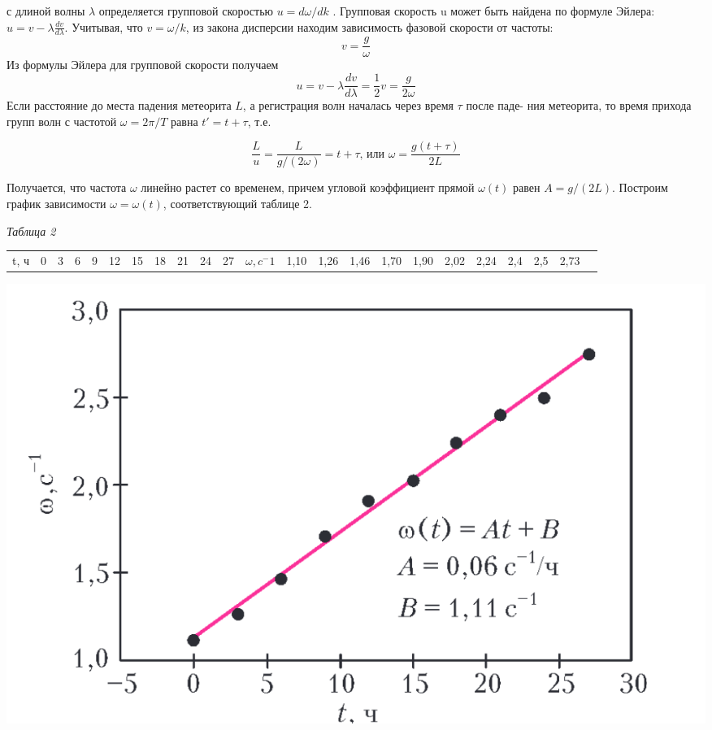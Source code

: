 \begin{multicols}{2}

\noindent
с длиной волны $\lambda$ определяется групповой скоростью $u = d \omega/dk$ . Групповая скорость u может быть найдена по формуле Эйлера: $u = v - \lambda \frac{dv}{d \lambda}$.
Учитывая, что $v = \omega / k$, из закона дисперсии находим
зависимость фазовой скорости от частоты:
$$ v = \frac{g}{\omega} $$
Из формулы Эйлера для групповой скорости получаем
$$ u = v - \lambda \frac{dv}{d \lambda} = \frac{1}{2}v = \frac{g}{2 \omega} $$
Если расстояние до места падения метеорита $L$, а
регистрация волн началась через время $\tau$ после паде-
ния метеорита, то время прихода групп волн с частотой $\omega = 2 \pi / T$ равна $t' = t + \tau$, т.е.

$$\frac{L}{u} = \frac{L}{g/(2\omega)} = t + \tau \textrm{, или } \omega = \frac{g(t + \tau)}{2L}$$

Получается, что частота $\omega$ линейно растет со временем, причем угловой коэффициент прямой $\omega(t)$ равен $A = g/(2L)$. Построим график зависимости $\omega = \omega(t)$, соответствующий таблице 2.

\null\hfill \textit{Таблица 2  }

\noindent
\scalebox{0.7}
{
\begin{left}
\begin{tabular}{|c|c|c|c|c|c|c|c|c|c|c|}
\hline
     t, ч & 0 & 3 & 6 & 9 & 12 & 15 & 18 & 21 & 24 & 27 &
 \hline
     $\omega, c^-1$ & 1,10 & 1,26 & 1,46 & 1,70 & 1,90 & 2,02 & 2,24 & 2,4 & 2,5 & 2,73 &
 \hline
\end{tabular}
\end{left}
}

\columnbreak

\begin{Figure}
 \centering
 \includegraphics[width=\linewidth]{sc.png}
\end{Figure}


\end{multicols}

